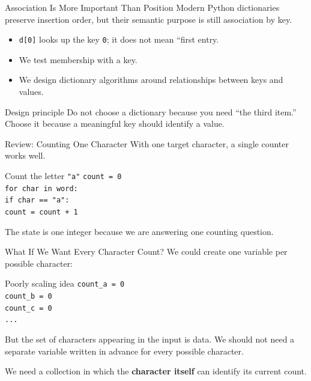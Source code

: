 \documentclass[aspectratio=169,10pt]{beamer}
\begin{document}
\begin{frame}{Association Is More Important Than Position}
  Modern Python dictionaries preserve insertion order, but their semantic purpose is still association by key.

  \begin{itemize}
    \item \texttt{d[0]} looks up the key \texttt{0}; it does not mean ``first entry.
    \item We test membership with a key.
    \item We design dictionary algorithms around relationships between keys and values.
  \end{itemize}

  \begin{alertblock}{Design principle}
    Do not choose a dictionary because you need ``the third item.'' Choose it because a meaningful key should identify a value.
  \end{alertblock}
\end{frame}


\begin{frame}{Review: Counting One Character}
  With one target character, a single counter works well.

  \begin{block}{Count the letter \texttt{"a"}}
    \texttt{count = 0}\\
    \texttt{for char in word:}\\
    \hspace{0.20in}\texttt{if char == "a":}\\
    \hspace{0.40in}\texttt{count = count + 1}
  \end{block}

  The state is one integer because we are answering one counting question.
\end{frame}

\begin{frame}{What If We Want Every Character Count?}
  We could create one variable per possible character:

  \begin{block}{Poorly scaling idea}
    \texttt{count\_a = 0}\\
    \texttt{count\_b = 0}\\
    \texttt{count\_c = 0}\\
    \texttt{...}
  \end{block}

  But the set of characters appearing in the input is data. We should not need a separate variable written in advance for every possible character.

  \begin{keyidea}
    We need a collection in which the \textbf{character itself} can identify its current count.
  \end{keyidea}
\end{frame}
\end{document}

